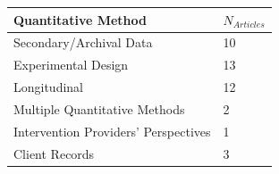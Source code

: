 \documentclass[]{tufte-handout}
\begin{document}
\begin{longtable}[]{@{}ll@{}}
\toprule
\begin{minipage}[b]{0.51\columnwidth}\raggedright\strut
Quantitative Method\strut
\end{minipage} & \begin{minipage}[b]{0.21\columnwidth}\raggedright\strut
\(N_{Articles}\)\strut
\end{minipage}\tabularnewline
\midrule
\endhead
\begin{minipage}[t]{0.51\columnwidth}\raggedright\strut
Secondary/Archival Data\strut
\end{minipage} & \begin{minipage}[t]{0.21\columnwidth}\raggedright\strut
10\strut
\end{minipage}\tabularnewline
\begin{minipage}[t]{0.51\columnwidth}\raggedright\strut
Experimental Design\strut
\end{minipage} & \begin{minipage}[t]{0.21\columnwidth}\raggedright\strut
13\strut
\end{minipage}\tabularnewline
\begin{minipage}[t]{0.51\columnwidth}\raggedright\strut
Longitudinal\strut
\end{minipage} & \begin{minipage}[t]{0.21\columnwidth}\raggedright\strut
12\strut
\end{minipage}\tabularnewline
\begin{minipage}[t]{0.51\columnwidth}\raggedright\strut
Multiple Quantitative Methods\strut
\end{minipage} & \begin{minipage}[t]{0.21\columnwidth}\raggedright\strut
2\strut
\end{minipage}\tabularnewline
\begin{minipage}[t]{0.51\columnwidth}\raggedright\strut
Intervention Providers' Perspectives\strut
\end{minipage} & \begin{minipage}[t]{0.21\columnwidth}\raggedright\strut
1\strut
\end{minipage}\tabularnewline
\begin{minipage}[t]{0.51\columnwidth}\raggedright\strut
Client Records\strut
\end{minipage} & \begin{minipage}[t]{0.21\columnwidth}\raggedright\strut
3\strut
\end{minipage}\tabularnewline

\end{longtable}
\end{document}
